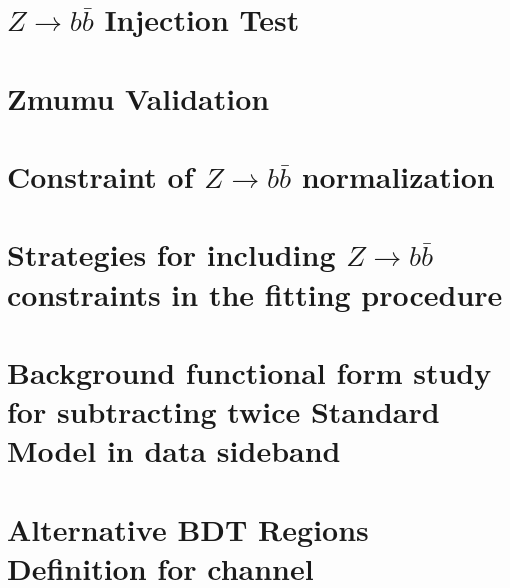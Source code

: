 \documentclass[UKenglish,texlive=2013]{\ATLASLATEXPATH atlasdoc}
\begin{document}
\section{$Z\rightarrow b \bar b$ Injection Test}
\label{sec:app-zinjection}


\clearpage
\section{Zmumu Validation}
\label{sec:app-zmm}


\clearpage
%
\section{Constraint of $Z\rightarrow b \bar b$ normalization}
\label{sec:app-zcon}

\clearpage

\section{Strategies for including $Z\rightarrow b \bar b$ constraints in the fitting procedure}
\label{sec:app-zstrat}


\clearpage
\section{Background functional form study for subtracting twice Standard Model \zjets{} in data sideband}
\label{sec:app-nonresonantbkg}


\clearpage
\section{Alternative BDT Regions Definition for \twocentral channel}
\label{sec:app-alternative2cen}

\end{document}
